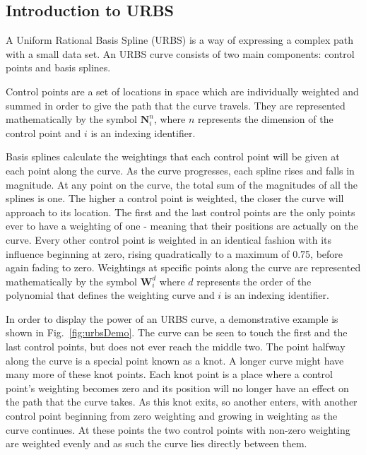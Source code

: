 \subsection{Introduction to URBS}
A Uniform Rational Basis Spline (URBS) is a way of expressing a complex path with a small data set. An URBS curve consists of two main components: control points and basis splines.

Control points are a set of locations in space which are individually weighted and summed in order to give the path that the curve travels. They are represented mathematically by the symbol $\textbf{N}^n_i$, where $n$ represents the dimension of the control point and $i$ is an indexing identifier.

Basis splines calculate the weightings that each control point will be given at each point along the curve. As the curve progresses, each spline rises and falls in magnitude. At any point on the curve, the total sum of the magnitudes of all the splines is one.
The higher a control point is weighted, the closer the curve will approach to its location. The first and the last control points are the only points ever to have a weighting of one - meaning that their positions are actually on the curve. Every other control point is weighted in an identical fashion with its influence beginning at zero, rising quadratically to a maximum of 0.75, before again fading to zero. Weightings at specific points along the curve are represented mathematically by the symbol $\textbf{W}_i^d$ where $d$ represents the order of the polynomial that defines the weighting curve and $i$ is an indexing identifier.

In order to display the power of an URBS curve, a demonstrative example is shown in Fig.~\ref{fig:urbsDemo}. The curve can be seen to touch the first and the last control points, but does not ever reach the middle two. The point halfway along the curve is a special point known as a 
knot. A longer curve might have many more of these knot points. Each knot point is a place where a control point's weighting becomes zero and its position will no longer have an effect on the path that the curve takes. As this knot exits, so another enters, with another control point beginning from zero weighting and growing in weighting as the curve continues. At these points the two control points with non-zero weighting are weighted evenly and as such the curve lies directly between them.

